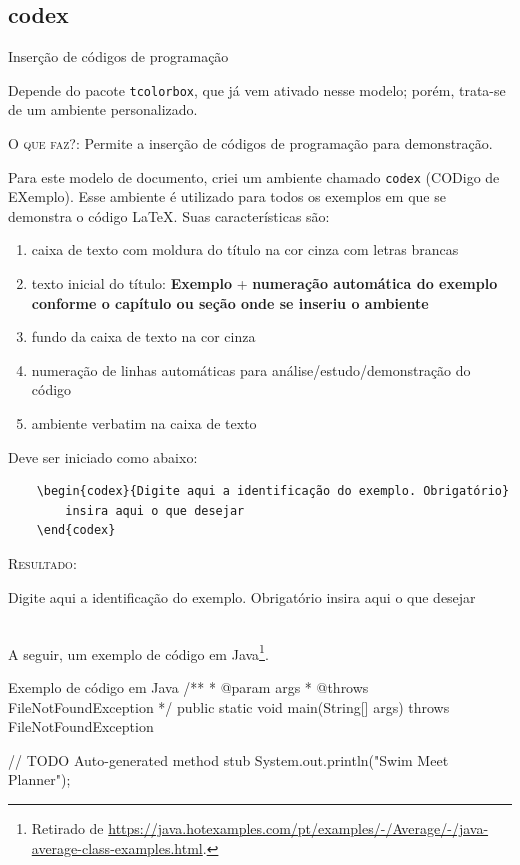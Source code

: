 \documentclass[a4paper,12pt,oneside,openright,extrafontsizes,openbib]{memoir}
\begin{document}
{\subsection{codex}{Inserção de códigos de programação}

Depende do pacote \verb|tcolorbox|, que já vem ativado nesse modelo; porém, trata-se de um ambiente personalizado.

\textsc{O que faz?}: Permite a inserção de códigos de programação para demonstração.

Para este modelo de documento, criei um ambiente chamado \verb|codex| (CODigo de EXemplo). Esse ambiente é utilizado para todos os exemplos em que se demonstra o código \LaTeX. Suas características são:

\begin{enumerate}
	\item caixa de texto com moldura do título na cor cinza com letras brancas
	\item texto inicial do título: \textbf{Exemplo} + \textbf{numeração automática do exemplo conforme o capítulo ou seção onde se inseriu o ambiente}
	\item fundo da caixa de texto na cor cinza
	\item numeração de linhas automáticas para análise/estudo/demonstração do código
	\item ambiente verbatim na caixa de texto
\end{enumerate} 

Deve ser iniciado como abaixo:

\begin{verbatim}
	\begin{codex}{Digite aqui a identificação do exemplo. Obrigatório}
		insira aqui o que desejar
	\end{codex}
\end{verbatim}

\textsc{Resultado:}
\ \\

\begin{codex}{Digite aqui a identificação do exemplo. Obrigatório}
	insira aqui o que desejar
\end{codex}
\ \\

A seguir, um exemplo de código em Java\footnote{Retirado de \url{https://java.hotexamples.com/pt/examples/-/Average/-/java-average-class-examples.html}.}.

\begin{codex}{Exemplo de código em Java}
	/**
	* @param args
	* @throws FileNotFoundException
	*/
	public static void main(String[] args) throws FileNotFoundException {
		// TODO Auto-generated method stub
		System.out.println("Swim Meet Planner");
		
}
\end{codex}}
\end{document}
